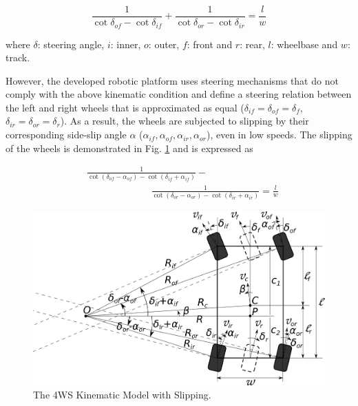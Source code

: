 \documentclass[conference]{IEEEtran}
\begin{document}
\begin{equation}
	\frac{1}{\cot{\delta_{of}} - \cot{\delta_{if}}} + \frac{1}{\cot{\delta_{or}} - \cot{\delta_{ir}}} = \frac{l}{w}
	\label{eq:4ws_condition}
\end{equation}

\noindent
where $\delta$: steering angle, $i$: inner, $o$: outer, $f$: front and $r$: rear, $l$: wheelbase and $w$: track.

However, the developed robotic platform uses steering mechanisms that do not comply with the above kinematic condition and define a steering relation between the left and right wheels that is approximated as equal ($\delta_{if}=\delta_{of}=\delta_f$, $\delta_{ir}=\delta_{or}=\delta_r$). As a result, the wheels are subjected to slipping by their corresponding side-slip angle $\alpha$ ($\alpha_{if}, \alpha_{of}, \alpha_{ir}, \alpha_{or}$), even in low speeds. The slipping of the wheels is demonstrated in Fig. \ref{fig:4ws_slip_model} and is expressed as

\begin{equation}
	\begin{split}
	&\frac{1}{\cot(\delta_{of} - \alpha_{of}) - \cot(\delta_{if} + \alpha_{if})} -\\ &\;\;\;\;\;\;\;\;\;\;\;\;\;\;\;\;\;\;\;\;\;\;\;\;\frac{1}{\cot(\delta_{or} - \alpha_{or}) - \cot(\delta_{ir} + \alpha_{ir})} = \frac{l}{w}
	\end{split}
	\label{eq:monst_kinematic_condition}
\end{equation}
	
\begin{figure}[!ht]
	\centering
	\includegraphics[width=\linewidth]{Figures/monst_slip_model.png}%
	\caption{The 4WS Kinematic Model with Slipping.}
	\label{fig:4ws_slip_model}
\end{figure}
\end{document}

